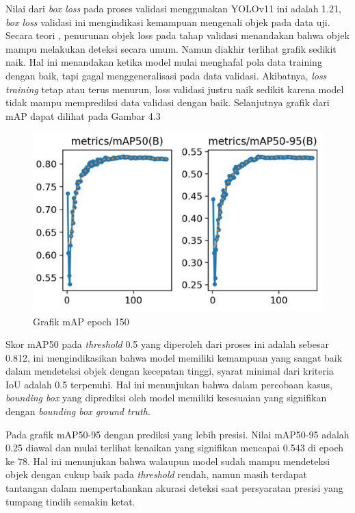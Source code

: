Nilai dari \emph{box loss} pada proses validasi menggunakan YOLOv11 ini adalah 1.21,
\emph{box loss} validasi ini mengindikasi kemampuan mengenali objek pada data uji. Secara teori
, penurunan objek loss pada tahap validasi menandakan bahwa objek mampu melakukan deteksi
secara umum. Namun diakhir terlihat grafik sedikit naik. Hal ini menandakan ketika model
mulai menghafal pola data training dengan baik, tapi gagal menggeneralisasi pada data validasi.
Akibatnya, \emph{loss training} tetap atau terus menurun, loss validasi justru naik sedikit karena
model tidak mampu memprediksi data validasi dengan baik. Selanjutnya grafik dari mAP dapat dilihat
pada Gambar 4.3
\begin{figure} [H] \centering
  \includegraphics[scale=0.63]{gambar/map grafik yolov11.jpg}
  \caption{Grafik mAP epoch 150}
  \label{fig:Pengujian Performa}
\end{figure}
Skor mAP50 pada \emph{threshold} 0.5 yang diperoleh dari proses ini adalah sebesar 0.812, ini mengindikasikan
bahwa model memiliki kemampuan yang sangat baik dalam mendeteksi objek dengan kecepatan tinggi,
syarat minimal dari kriteria IoU adalah 0.5 terpenuhi. Hal ini menunjukan bahwa dalam percobaan kasus, \emph{bounding box}
yang diprediksi oleh model memiliki kesesuaian yang signifikan dengan \emph{bounding box ground truth}. 

Pada grafik mAP50-95 dengan prediksi yang lebih presisi. Nilai mAP50-95 adalah 0.25 diawal dan mulai terlihat kenaikan yang 
signifikan mencapai 0.543 di epoch ke 78. Hal ini menunjukan bahwa walaupun model sudah mampu mendeteksi objek dengan cukup
baik pada \emph{threshold} rendah, namun masih terdapat tantangan dalam mempertahankan akurasi deteksi
saat persyaratan presisi yang tumpang tindih semakin ketat.

